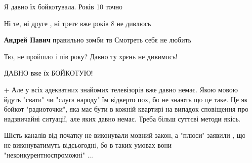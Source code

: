 \begin{itemize}
Я давно їх бойкотувала. Років 10 точно

 
Ні те, ні друге , ні третє вже років 8 не дивлюсь

 
\textbf{Андрей Павич} правильно зомби тв Смотреть себя не любить

 
Тю, не пройшло і пів року? Давно ту хрєнь не дивимось!

 
ДАВНО вже їх БОЙКОТУЮ!

 

+ Але у всіх адекватних знайомих телевізорів вже давно немає. Якою мовою йдуть
"свати" чи "слуга народу" їм відверто пох, бо не знають що це таке. Це як
бойкот "радиоточки", яка має бути в кожній квартирі на випадок сповіщення про
надзвичайні ситуації, але яких давно немає. Треба більш суттєві методи якісь.

 

Шість каналів від початку не виконували мовний закон, а "плюси" заявили , що не
виконуватимуть відсьогодні, бо в таких умовах вони "неконкурентноспроможні" ...


\end{itemize}
